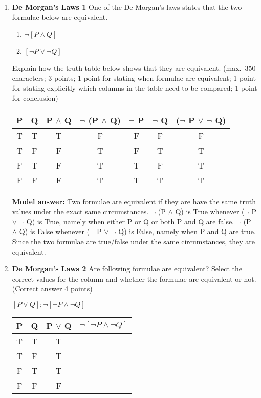 \documentclass[a4,11pt]{article}
\newcommand{\6}{\mbox{$[\hspace*{-.6mm}[$}}
\newcommand{\9}{\mbox{$]\hspace*{-.6mm}]$}}
\begin{document}
\begin{enumerate}[leftmargin = 12pt]
\item {\bf De Morgan's Laws 1} One of the De Morgan's laws states that the two formulae below are equivalent. 

\begin{enumerate}
\item  $\neg [ P \land  Q ]$
\item  $ [ \neg P \lor \neg Q ]$
\end{enumerate}

Explain how the truth table below shows that they are equivalent. (max.\ 350 characters; 3 points; 1 point for stating when formulae are equivalent; 1 point for stating explicitly which columns in the table need to be compared; 1 point for conclusion)

\begin{tabular}{c | c | c | c | c | c | c}
\hline \hline
P & Q & P $\land$ Q & $\neg$ (P $\land$ Q) & $\neg$ P & $\neg$ Q & ($\neg$ P $\lor$ $\neg$ Q) \\
\hline \hline
T & T & T  & F & F & F & F\\
T & F & F & T & F & T & T\\
F & T & F& T & T & F & T\\
F & F & F& T& T & T & T\\
\hline \hline


\end{tabular}

{ \bf Model answer:} Two formulae are equivalent if they are have the same truth values under the exact same circumstances. $\neg$ (P $\land$ Q) is True whenever ($\neg$ P $\lor$ $\neg$ Q) is True, namely when either P or Q or both P and Q are false. $\neg$ (P $\land$ Q) is False whenever  ($\neg$ P $\lor$ $\neg$ Q) is False, namely when P and Q are true. Since the two formulae are true/false under the same circumstances, they are equivalent.




\item {\bf De Morgan's Laws 2} Are following formulae are equivalent? Select the correct values for the column and whether the formulae are equivalent or not. (Correct answer 4 points)

 $[P \lor Q]; \neg [ \neg P \land \neg Q]$


\begin{tabular}{c | c | c | c }
\hline \hline
P & Q & P $\lor$ Q & $\neg [ \neg P \land \neg Q]$ \\
\hline \hline
T & T & T \\
T & F & T \\
F & T & T \\
F & F & F \\
\hline \hline
\end{tabular}


\end{enumerate}
\end{document}
